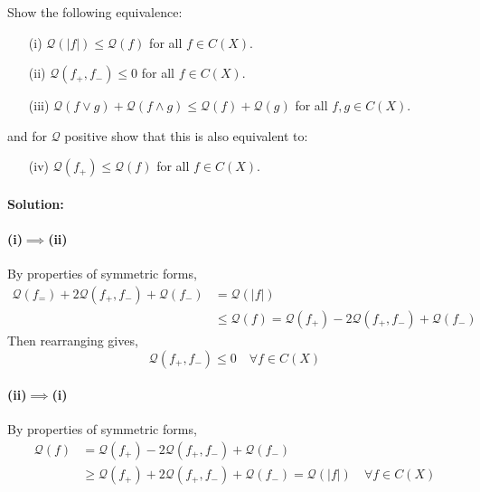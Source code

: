Show the following equivalence:
\begin{itemize}
	\item [(i)]
		$\mathcal{Q}(|f|) \leq \mathcal{Q}(f)$ for all $f\in C(X)$.
	\item [(ii)]
		$\mathcal{Q}(f_{+},f_{-}) \leq 0$ for all $f\in C(X)$.
	\item [(iii)]
		$\mathcal{Q}(f\vee g) + \mathcal{Q}(f\wedge g) \leq \mathcal{Q}(f) + \mathcal{Q}(g)$ for all $f,g\in C(X)$.
\end{itemize}
and for $\mathcal{Q}$ positive show that this is also equivalent to:
\begin{itemize}
	\item [(iv)]
		$\mathcal{Q}(f_{+}) \leq \mathcal{Q}(f)$ for all $f\in C(X)$.
\end{itemize}

\paragraph{Solution:}

\paragraph{(i)$\implies$(ii)}
By properties of symmetric forms,
\begin{equation*}
	\begin{aligned}
		\mathcal{Q}(f_{=}) + 2\mathcal{Q}(f_{+},f_{-}) + \mathcal{Q}(f_{-}) &= \mathcal{Q}(|f|)\\
		&\leq \mathcal{Q}(f) = \mathcal{Q}(f_{+}) - 2\mathcal{Q}(f_{+},f_{-}) + \mathcal{Q}(f_{-})
	\end{aligned}
\end{equation*}
Then rearranging gives,
\begin{equation*}
	\mathcal{Q}(f_{+},f_{-}) \leq 0 \quad \forall f\in C(X)
\end{equation*}

\paragraph{(ii)$\implies$(i)}
By properties of symmetric forms,
\begin{equation*}
	\begin{aligned}
		\mathcal{Q}(f) &= \mathcal{Q}(f_{+}) - 2\mathcal{Q}(f_{+},f_{-}) + \mathcal{Q}(f_{-})\\
		&\geq \mathcal{Q}(f_{+}) + 2\mathcal{Q}(f_{+},f_{-}) + \mathcal{Q}(f_{-}) = \mathcal{Q}(|f|) \quad \forall f\in C(X)
	\end{aligned}
\end{equation*}


